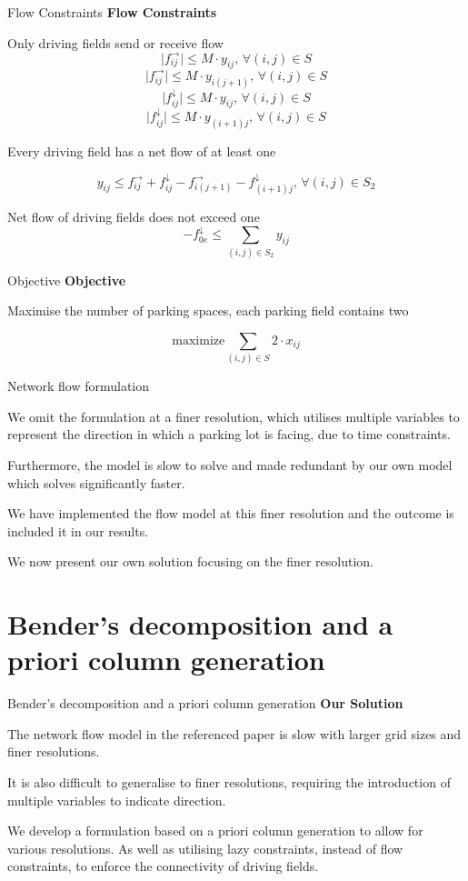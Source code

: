\documentclass{beamer}
\begin{document}
\begin{frame}{Flow Constraints}
\textbf{Flow Constraints}\medskip

Only driving fields send or receive flow
$$\lvert f_{ij}^\rightarrow \rvert \leq M \cdot y_{ij}, \, \forall (i,j) \in S$$
$$\lvert f_{ij}^\rightarrow \rvert \leq M \cdot y_{i(j+1)}, \, \forall (i,j) \in S$$
$$\lvert f_{ij}^\downarrow \rvert \leq M \cdot y_{ij}, \, \forall (i,j) \in S$$    
$$\lvert f_{ij}^\downarrow \rvert \leq M \cdot y_{(i+1)j}, \, \forall (i,j) \in S$$    

Every driving field has a net flow of at least one

$$y_{ij} \leq f_{ij}^\rightarrow + f_{ij}^\downarrow -f_{i(j+1)}^\rightarrow - f_{(i+1)j}^\downarrow,\, \forall (i,j) \in S_2$$

Net flow of driving fields does not exceed one
$$-f_{0e}^\downarrow \leq \sum_{(i,j) \in S_2} y_{ij}$$
\end{frame}

\begin{frame}{Objective}
\textbf{Objective}\medskip

Maximise the number of parking spaces, each parking field contains two

$$\textrm{maximize} \sum_{(i,j) \in S} 2 \cdot x_{ij}$$
    
\end{frame}

\begin{frame}{Network flow formulation}

    We omit the formulation at a finer resolution, which utilises multiple variables to represent the direction in which a parking lot is facing, due to time constraints.\medskip
    
    Furthermore, the model is slow to solve and made redundant by our own model which solves significantly faster. \medskip
    
    We have implemented the flow model at this finer resolution and the outcome is included it in our results.\medskip
    
    We now present our own solution focusing on the finer resolution.
\end{frame}

\section{Bender's decomposition and a priori column generation}
\begin{frame}{Bender's decomposition and a priori column generation}
\textbf{Our Solution}\medskip

The network flow model in the referenced paper is slow with larger grid sizes and finer resolutions.\medskip

It is also difficult to generalise to finer resolutions, requiring the introduction of multiple variables to indicate direction.\medskip

We develop a formulation based on a priori column generation to allow for various resolutions. As well as utilising lazy constraints, instead of flow constraints, to enforce the connectivity of driving fields.

\end{frame}
\end{document}
